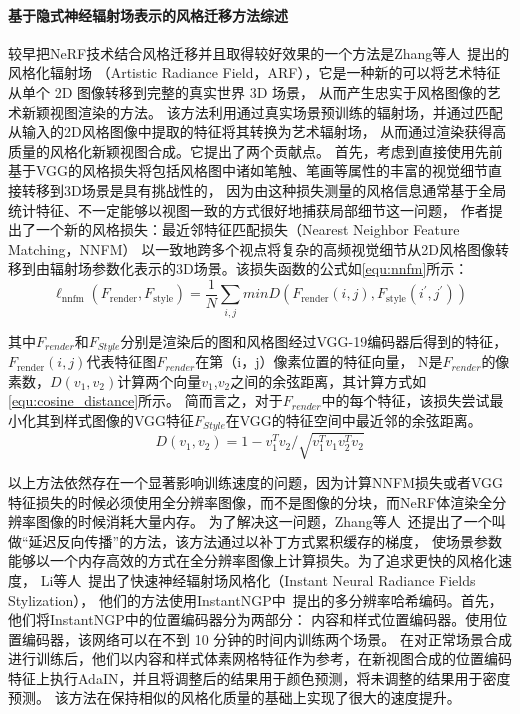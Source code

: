 \paragraph{基于隐式神经辐射场表示的风格迁移方法综述}
较早把NeRF技术结合风格迁移并且取得较好效果的一个方法是Zhang等人~\cite{zhang2022arf}提出的风格化辐射场
（Artistic Radiance Field，ARF），它是一种新的可以将艺术特征从单个 2D 图像转移到完整的真实世界 3D 场景，
从而产生忠实于风格图像的艺术新颖视图渲染的方法。
该方法利用通过真实场景预训练的辐射场，并通过匹配从输入的2D风格图像中提取的特征将其转换为艺术辐射场，
从而通过渲染获得高质量的风格化新颖视图合成。它提出了两个贡献点。
首先，考虑到直接使用先前基于VGG的风格损失将包括风格图中诸如笔触、笔画等属性的丰富的视觉细节直接转移到3D场景是具有挑战性的，
因为由这种损失测量的风格信息通常基于全局统计特征、不一定能够以视图一致的方式很好地捕获局部细节这一问题，
作者提出了一个新的风格损失：最近邻特征匹配损失（Nearest Neighbor Feature Matching，NNFM）
以一致地跨多个视点将复杂的高频视觉细节从2D风格图像转移到由辐射场参数化表示的3D场景。该损失函数的公式如\autoref{equ:nnfm}所示：
\begin{equation}
    \label{equ:nnfm}
    \ell_{\mathrm{nnfm}}(F_{\mathrm{render}},F_{\mathrm{style}})=\frac1N\sum_{i,j}minD(F_{\mathrm{render}}(i,j),F_{\mathrm{style}}(i^{\prime},j^{\prime}))
\end{equation}

其中$F_{render}$和$F_{Style}$分别是渲染后的图和风格图经过VGG-19编码器后得到的特征，
$F_{\mathrm{render}}(i,j)$代表特征图$F_{render}$在第（i，j）像素位置的特征向量，
N是$F_{render}$的像素数，$D(v_1,v_2)$计算两个向量$v_1$,$v_2$之间的余弦距离，其计算方式如\autoref{equ:cosine_distance}所示。
简而言之，对于$F_{render}$中的每个特征，该损失尝试最小化其到样式图像的VGG特征$F_{Style}$在VGG的特征空间中最近邻的余弦距离。
\begin{equation}
    \label{equ:cosine_distance}
    D(v_1,v_2)=1-v_1^Tv_2/\sqrt{v_1^Tv_1v_2^Tv_2}
\end{equation}


以上方法依然存在一个显著影响训练速度的问题，因为计算NNFM损失或者VGG特征损失的时候必须使用全分辨率图像，而不是图像的分块，而NeRF体渲染全分辨率图像的时候消耗大量内存。
为了解决这一问题，Zhang等人~\cite{zhang2022arf}还提出了一个叫做“延迟反向传播”的方法，该方法通过以补丁方式累积缓存的梯度，
使场景参数能够以一个内存高效的方式在全分辨率图像上计算损失。为了追求更快的风格化速度，
Li等人~\cite{li2023instant}提出了快速神经辐射场风格化（Instant Neural Radiance Fields Stylization），
他们的方法使用InstantNGP中~\cite{muller2022instant}提出的多分辨率哈希编码。首先，他们将InstantNGP中的位置编码器分为两部分：
内容和样式位置编码器。使用位置编码器，该网络可以在不到 10 分钟的时间内训练两个场景。
在对正常场景合成进行训练后，他们以内容和样式体素网格特征作为参考，在新视图合成的位置编码特征上执行AdaIN，并且将调整后的结果用于颜色预测，将未调整的结果用于密度预测。
该方法在保持相似的风格化质量的基础上实现了很大的速度提升。

